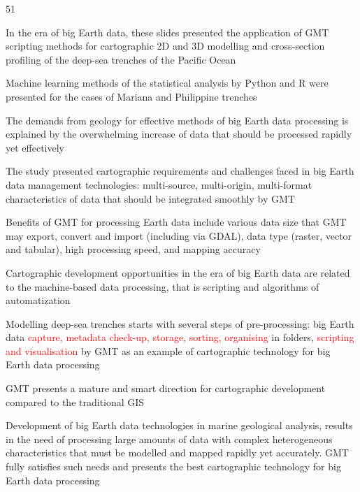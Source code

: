 \documentclass[pdflatex,compress,8pt,
	xcolor={dvipsnames,svgnames,x11names,table},
	hyperref={colorlinks = true,breaklinks = true, urlcolor = NavyBlue}]{beamer}
\begin{document}
\begin{frame}
\begin{dinglist}{51}\footnotesize
     \item In the era of big Earth data, these slides presented the application of GMT scripting methods for cartographic 2D and 3D modelling and cross-section profiling of the deep-sea trenches of the Pacific Ocean
     \item Machine learning methods of the statistical analysis by Python and R were presented for the cases of Mariana and Philippine trenches
     \item The demands from geology for effective methods of big Earth data processing is explained by the overwhelming increase of data that should be processed rapidly yet effectively
     \item The study presented cartographic requirements and challenges faced in big Earth data management technologies: multi-source, multi-origin, multi-format characteristics of data that should be integrated smoothly by GMT
     \item Benefits of GMT for processing Earth data include various data size that GMT may export, convert and import (including via GDAL), data type (raster, vector and tabular), high processing speed, and mapping accuracy
     \item Cartographic development opportunities in the era of big Earth data are related to the machine-based data processing, that is scripting and algorithms of automatization
     \item Modelling deep-sea trenches starts with several steps of pre-processing: big Earth data \textcolor{red}{capture, metadata check-up, storage, sorting, organising} in folders, \textcolor{red}{scripting and visualisation} by GMT as an example of cartographic technology for big Earth data processing
     \item GMT presents a mature and smart direction for cartographic development compared to the traditional GIS
     \item Development of big Earth data technologies in marine geological analysis, results in the need of processing large amounts of data with complex heterogeneous characteristics that must be modelled and mapped rapidly yet accurately. GMT fully satisfies such needs and presents the best cartographic technology for big Earth data processing
 \end{dinglist} 
\end{frame}

\end{document}
